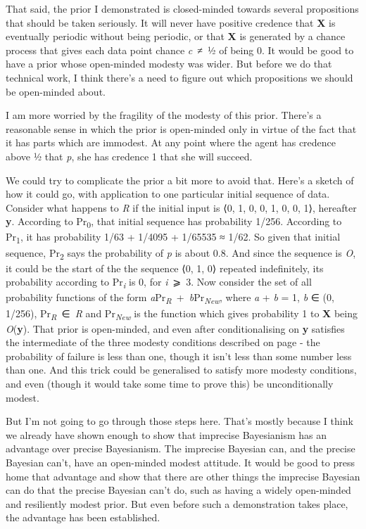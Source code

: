 \documentclass[
  11pt,
  letterpaper,
  DIV=11,
  numbers=noendperiod,
  twoside]{scrartcl}
\begin{document}
That said, the prior I demonstrated is closed-minded towards several
propositions that should be taken seriously. It will never have positive
credence that \textbf{X} is eventually periodic without being periodic,
or that \textbf{X} is generated by a chance process that gives each data
point chance \emph{c}~≠~½ of being 0. It would be good to have a prior
whose open-minded modesty was wider. But before we do that technical
work, I think there's a need to figure out which propositions we should
be open-minded about.

I am more worried by the fragility of the modesty of this prior. There's
a reasonable sense in which the prior is open-minded only in virtue of
the fact that it has parts which are immodest. At any point where the
agent has credence above ½ that \emph{p}, she has credence 1 that she
will succeed.

We could try to complicate the prior a bit more to avoid that. Here's a
sketch of how it could go, with application to one particular initial
sequence of data. Consider what happens to \emph{R} if the initial input
is ⟨0, 1, 0, 0, 1, 0, 0, 1⟩, hereafter \textbf{y}. According to
Pr\textsubscript{0}, that initial sequence has probability 1/256.
According to Pr\textsubscript{1}, it has probability 1/63 + 1/4095 +
1/65535 ≈ 1/62. So given that initial sequence, Pr\textsubscript{2} says
the probability of \emph{p} is about 0.8. And since the sequence is
\emph{O}, it could be the start of the the sequence ⟨0, 1, 0⟩ repeated
indefinitely, its probability according to Pr\textsubscript{\emph{i}} is
0, for \emph{i}~⩾~3. Now consider the set of all probability functions
of the form
\emph{a}Pr\textsubscript{\emph{R}}~+~\emph{b}Pr\textsubscript{\emph{New}},
where \emph{a} + \emph{b} = 1, \emph{b} ∈ (0, 1/256),
Pr\textsubscript{\emph{R}}~∈~\emph{R} and Pr\textsubscript{\emph{New}}
is the function which gives probability 1 to \textbf{X} being
\emph{O}(\textbf{y}). That prior is open-minded, and even after
conditionalising on \textbf{y} satisfies the intermediate of the three
modesty conditions described on page - the probability of failure is
less than one, though it isn't less than some number less than one. And
this trick could be generalised to satisfy more modesty conditions, and
even (though it would take some time to prove this) be unconditionally
modest.

But I'm not going to go through those steps here. That's mostly because
I think we already have shown enough to show that imprecise Bayesianism
has an advantage over precise Bayesianism. The imprecise Bayesian can,
and the precise Bayesian can't, have an open-minded modest attitude. It
would be good to press home that advantage and show that there are other
things the imprecise Bayesian can do that the precise Bayesian can't do,
such as having a widely open-minded and resiliently modest prior. But
even before such a demonstration takes place, the advantage has been
established.
\end{document}
